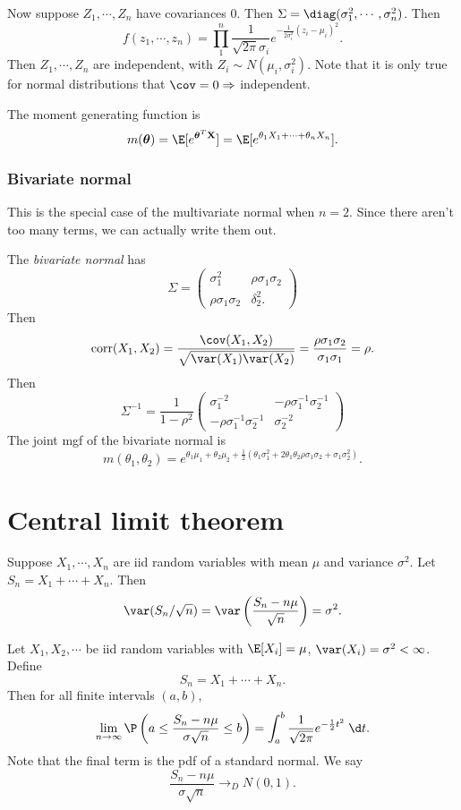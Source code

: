 \documentclass[a4paper]{article}
\begin{document}
Now suppose $Z_1, \cdots, Z_n$ have covariances $0$. Then $\Sigma = \diag(\sigma_1^2, \cdots, \sigma_n^2)$. Then
\[
  f(z_1, \cdots, z_n) = \prod_1^n \frac{1}{\sqrt{2\pi}\sigma_i} e^{-\frac{1}{2\sigma_i^2}(z_i - \mu_i)^2}.
\]
Then $Z_1, \cdots, Z_n$ are independent, with $Z_i\sim N(\mu_i, \sigma_i^2)$. Note that it is only true for normal distributions that $\cov = 0\Rightarrow$ independent.

The moment generating function is
\[
  m(\boldsymbol\theta) = \E[e^{\boldsymbol\theta^T \mathbf{X}}] = \E[e^{\theta_1 X_1 + \cdots + \theta_n X_n}].
\]
\subsubsection*{Bivariate normal}
This is the special case of the multivariate normal when $n = 2$. Since there aren't too many terms, we can actually write them out.

The \emph{bivariate normal} has
\[
  \Sigma=
  \begin{pmatrix}
    \sigma_1^2 & \rho\sigma_1\sigma_2\\
    \rho\sigma_1\sigma_2 & \delta_2^2.
  \end{pmatrix}
\]
Then
\[
  \mathrm{corr}(X_1, X_2) = \frac{\cov(X_1, X_2)}{\sqrt{\var(X_1)\var(X_2)}} = \frac{\rho\sigma_1\sigma_2}{\sigma_1\sigma_1} = \rho.
\]
Then
\[
  \Sigma^{-1} = \frac{1}{1 - \rho^2}
  \begin{pmatrix}
    \sigma_1^{-2} & -\rho\sigma_1^{-1}\sigma_2^{-1}\\
    -\rho\sigma_1^{-1}\sigma_2^{-1} & \sigma_2^{-2}
  \end{pmatrix}
\]
The joint mgf of the bivariate normal is
\[
  m(\theta_1, \theta_2) = e^{\theta_1\mu_1 + \theta_2 \mu_2 + \frac{1}{2}(\theta_1\sigma_1^2 + 2\theta_1\theta_2\rho\sigma_1\sigma_2 + \sigma_1\sigma_2^2)}.
\]
\section{Central limit theorem}
Suppose $X_1, \cdots, X_n$ are iid random variables with mean $\mu$ and variance $\sigma^2$. Let $S_n = X_1 + \cdots + X_n$. Then 
\[
  \var(S_n/\sqrt{n}) = \var\left(\frac{S_n - n \mu}{\sqrt{n}}\right) = \sigma^2.
\]
\begin{thm}
  Let $X_1, X_2, \cdots$ be iid random variables with $\E[X_i] = \mu$, $\var(X_i) = \sigma^2 < \infty$. Define
  \[
    S_n = X_1 + \cdots + X_n.
  \]
  Then for all finite intervals $(a, b)$,
  \[
    \lim_{n \to \infty}\P\left(a \leq \frac{S_{n} - n\mu}{\sigma\sqrt{n}} \leq b\right) = \int_a^b \frac{1}{\sqrt{2\pi}} e^{-\frac{1}{2}t^2}\;\d t.
  \]
  Note that the final term is the pdf of a standard normal. We say
  \[
    \frac{S_n - n\mu}{\sigma\sqrt{n}} \to_{D} N(0, 1).
  \]
\end{thm}
\end{document}
